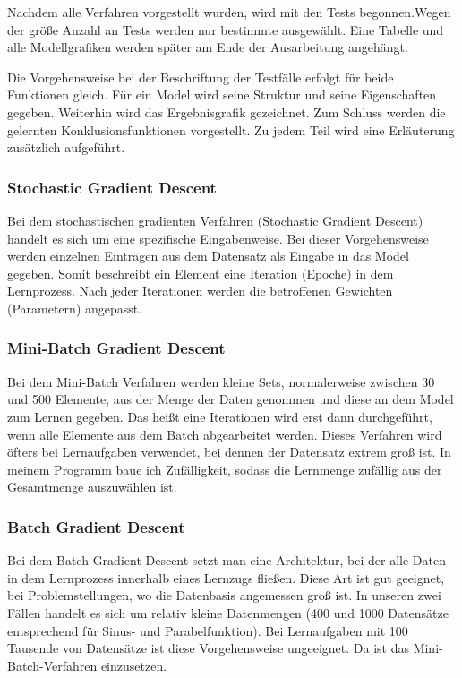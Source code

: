 Nachdem alle Verfahren vorgestellt wurden, wird mit den Tests begonnen.Wegen der größe Anzahl an Tests werden nur bestimmte ausgewählt. Eine Tabelle und alle Modellgrafiken werden später am Ende der Ausarbeitung angehängt. 

Die Vorgehensweise bei der Beschriftung der Testfälle erfolgt für beide Funktionen gleich. Für ein Model wird seine Struktur und seine Eigenschaften gegeben. Weiterhin wird das Ergebnisgrafik gezeichnet. Zum Schluss werden die gelernten Konklusionsfunktionen vorgestellt. Zu jedem Teil wird eine Erläuterung zusätzlich aufgeführt. 
 
\subsubsection{Stochastic Gradient Descent}
Bei dem stochastischen gradienten Verfahren (Stochastic Gradient Descent) handelt es sich um eine spezifische Eingabenweise. Bei dieser Vorgehensweise werden einzelnen Einträgen aus dem Datensatz als Eingabe in das Model gegeben. Somit beschreibt ein Element eine Iteration (Epoche) in dem Lernprozess. Nach jeder Iterationen werden die betroffenen Gewichten (Parametern) angepasst. \cite{SBMB:19}


\subsubsection{Mini-Batch Gradient Descent} \label{mini_batch}
Bei dem Mini-Batch Verfahren werden kleine Sets, normalerweise zwischen 30 und 500 Elemente, aus der Menge der Daten genommen und diese an dem Model zum Lernen gegeben. Das heißt eine Iterationen wird erst dann durchgeführt, wenn alle Elemente aus dem Batch abgearbeitet werden. Dieses Verfahren wird öfters bei Lernaufgaben verwendet, bei dennen der Datensatz extrem groß ist. In meinem Programm baue ich Zufälligkeit, sodass die Lernmenge zufällig aus der Gesamtmenge auszuwählen ist. \cite{SBMB:19}

\subsubsection{Batch Gradient Descent}\label{batch}
Bei dem Batch Gradient Descent setzt man eine Architektur, bei der alle Daten in dem Lernprozess innerhalb eines Lernzugs fließen. Diese Art ist gut geeignet, bei Problemstellungen, wo die Datenbasis angemessen groß ist. In unseren zwei Fällen handelt es sich um relativ kleine Datenmengen (400 und 1000 Datensätze entsprechend für Sinus- und Parabelfunktion). Bei Lernaufgaben mit 100 Tausende von Datensätze ist diese Vorgehensweise ungeeignet. Da ist das Mini-Batch-Verfahren einzusetzen. \cite{SBMB:19}

